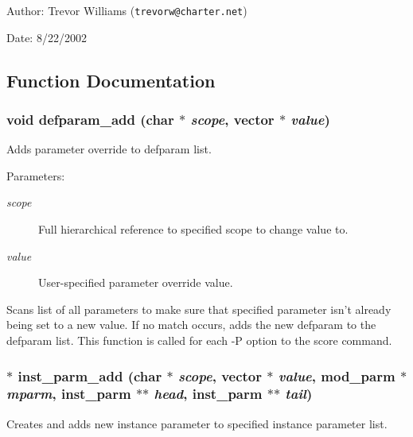 \begin{Desc}
\item[Author:]Trevor Williams ({\tt trevorw@charter.net}) \end{Desc}
\begin{Desc}
\item[Date:]8/22/2002 \end{Desc}


\subsection{Function Documentation}
\subsubsection{\setlength{\rightskip}{0pt plus 5cm}void defparam\_\-add (char $\ast$ {\em scope}, {\bf vector} $\ast$ {\em value})}\label{param_8h_a7}


Adds parameter override to defparam list. 

\begin{Desc}
\item[Parameters:]
\begin{description}
\item[{\em scope}]Full hierarchical reference to specified scope to change value to. \item[{\em value}]User-specified parameter override value.\end{description}
\end{Desc}
Scans list of all parameters to make sure that specified parameter isn't already being set to a new value. If no match occurs, adds the new defparam to the defparam list. This function is called for each -P option to the score command. 
\subsubsection{$\ast$ inst\_\-parm\_\-add (char $\ast$ {\em scope}, {\bf vector} $\ast$ {\em value}, {\bf mod\_\-parm} $\ast$ {\em mparm}, {\bf inst\_\-parm} $\ast$$\ast$ {\em head}, {\bf inst\_\-parm} $\ast$$\ast$ {\em tail})}\label{param_8h_a6}


Creates and adds new instance parameter to specified instance parameter list. 

